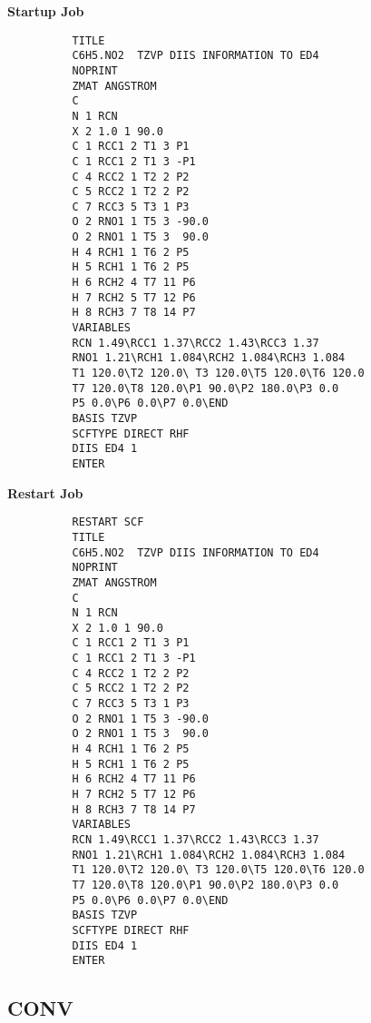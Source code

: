 \documentclass[11pt,fleqn]{article}
\begin{document}
{\bf Startup Job}
{
\footnotesize
\begin{verbatim}
          TITLE        
          C6H5.NO2  TZVP DIIS INFORMATION TO ED4
          NOPRINT
          ZMAT ANGSTROM
          C
          N 1 RCN
          X 2 1.0 1 90.0
          C 1 RCC1 2 T1 3 P1
          C 1 RCC1 2 T1 3 -P1
          C 4 RCC2 1 T2 2 P2
          C 5 RCC2 1 T2 2 P2
          C 7 RCC3 5 T3 1 P3
          O 2 RNO1 1 T5 3 -90.0
          O 2 RNO1 1 T5 3  90.0
          H 4 RCH1 1 T6 2 P5
          H 5 RCH1 1 T6 2 P5
          H 6 RCH2 4 T7 11 P6
          H 7 RCH2 5 T7 12 P6
          H 8 RCH3 7 T8 14 P7
          VARIABLES
          RCN 1.49\RCC1 1.37\RCC2 1.43\RCC3 1.37
          RNO1 1.21\RCH1 1.084\RCH2 1.084\RCH3 1.084
          T1 120.0\T2 120.0\ T3 120.0\T5 120.0\T6 120.0
          T7 120.0\T8 120.0\P1 90.0\P2 180.0\P3 0.0
          P5 0.0\P6 0.0\P7 0.0\END
          BASIS TZVP
          SCFTYPE DIRECT RHF
          DIIS ED4 1
          ENTER
\end{verbatim}
}
{\bf Restart Job}
{
\footnotesize
\begin{verbatim}
          RESTART SCF
          TITLE        
          C6H5.NO2  TZVP DIIS INFORMATION TO ED4
          NOPRINT
          ZMAT ANGSTROM
          C
          N 1 RCN
          X 2 1.0 1 90.0
          C 1 RCC1 2 T1 3 P1
          C 1 RCC1 2 T1 3 -P1
          C 4 RCC2 1 T2 2 P2
          C 5 RCC2 1 T2 2 P2
          C 7 RCC3 5 T3 1 P3
          O 2 RNO1 1 T5 3 -90.0
          O 2 RNO1 1 T5 3  90.0
          H 4 RCH1 1 T6 2 P5
          H 5 RCH1 1 T6 2 P5
          H 6 RCH2 4 T7 11 P6
          H 7 RCH2 5 T7 12 P6
          H 8 RCH3 7 T8 14 P7
          VARIABLES
          RCN 1.49\RCC1 1.37\RCC2 1.43\RCC3 1.37
          RNO1 1.21\RCH1 1.084\RCH2 1.084\RCH3 1.084
          T1 120.0\T2 120.0\ T3 120.0\T5 120.0\T6 120.0
          T7 120.0\T8 120.0\P1 90.0\P2 180.0\P3 0.0
          P5 0.0\P6 0.0\P7 0.0\END
          BASIS TZVP
          SCFTYPE DIRECT RHF
          DIIS ED4 1
          ENTER
\end{verbatim}
}

\subsection[CONV]{CONV}
\end{document}
